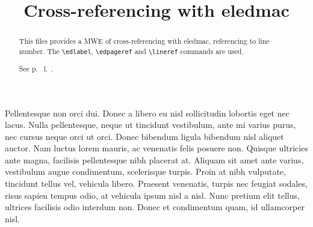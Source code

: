 \documentclass{article}
\begin{document}
\begin{english}
\title{Cross-referencing with eledmac}
\date{}
\maketitle
\begin{abstract}
This files provides a MWE of cross-referencing with eledmac, referencing to line number.
The \verb+\edlabel+, \verb+\edpageref+ and \verb+\lineref+ commands are used.

See p.~ l.~.
\end{abstract}
\end{english}

\beginnumbering

\pstart
Pellentesque non orci dui. Donec a libero eu nisl sollicitudin lobortis eget nec lacus. Nulla pellentesque, neque ut tincidunt vestibulum, ante mi varius purus, nec cursus neque orci ut orci. Donec bibendum ligula bibendum nisl aliquet auctor. Nam luctus lorem mauris, ac venenatis felis posuere non. Quisque ultricies ante magna, facilisis pellentesque nibh placerat at. Aliquam sit amet ante varius, vestibulum augue condimentum, scelerisque turpis. Proin at nibh vulputate, tincidunt tellus vel, vehicula libero. Praesent venenatis, turpis nec feugiat sodales, risus sapien tempus odio, at vehicula ipsum nisl a nisl. Nunc pretium elit tellus, ultrices facilisis odio interdum non. Donec et condimentum quam, id ullamcorper nisl.
\pend
\end{document}
